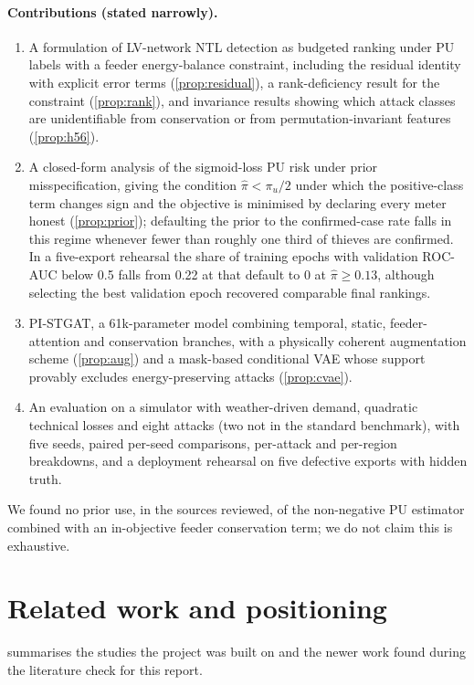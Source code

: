 \documentclass[11pt,a4paper]{article}
\theoremstyle{plain}
\theoremstyle{definition}
\theoremstyle{remark}
\begin{document}
\paragraph{Contributions (stated narrowly).}
\begin{enumerate}[label=C\arabic*.]
\item A formulation of LV-network NTL detection as budgeted ranking under PU labels with a feeder energy-balance constraint, including the residual identity with explicit error terms (\cref{prop:residual}), a rank-deficiency result for the constraint (\cref{prop:rank}), and invariance results showing which attack classes are unidentifiable from conservation or from permutation-invariant features (\cref{prop:h56}).
\item A closed-form analysis of the sigmoid-loss PU risk under prior misspecification, giving the condition $\hat\pi<\pi_u/2$ under which the positive-class term changes sign and the objective is minimised by declaring every meter honest (\cref{prop:prior}); defaulting the prior to the confirmed-case rate falls in this regime whenever fewer than roughly one third of thieves are confirmed. In a five-export rehearsal the share of training epochs with validation ROC-AUC below 0.5 falls from 0.22 at that default to 0 at $\hat\pi\ge0.13$, although selecting the best validation epoch recovered comparable final rankings.
\item PI-STGAT, a 61k-parameter model combining temporal, static, feeder-attention and conservation branches, with a physically coherent augmentation scheme (\cref{prop:aug}) and a mask-based conditional VAE whose support provably excludes energy-preserving attacks (\cref{prop:cvae}).
\item An evaluation on a simulator with weather-driven demand, quadratic technical losses and eight attacks (two not in the standard benchmark), with five seeds, paired per-seed comparisons, per-attack and per-region breakdowns, and a deployment rehearsal on five defective exports with hidden truth.
\end{enumerate}
We found no prior use, in the sources reviewed, of the non-negative PU estimator combined with an in-objective feeder conservation term; we do not claim this is exhaustive.

\section{Related work and positioning}
 summarises the studies the project was built on and the newer work found during the literature check for this report.
\end{document}
